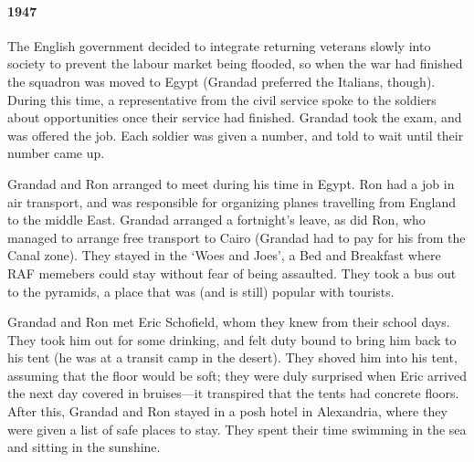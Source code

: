 \paragraph{1947} The English government
decided to integrate returning veterans slowly into society to prevent the labour market being
flooded, so when the war had finished the squadron was moved to Egypt (Grandad preferred the Italians, though).
During this time, a
representative from the civil service spoke to the soldiers about opportunities once their
service had finished. Grandad took the exam, and was offered the job. Each soldier was given
a number, and told to wait until their number came up.
\begin{figure}
	\centering
\end{figure}

Grandad and Ron arranged to meet during his time in Egypt. Ron had a job
in air transport, and was responsible for organizing planes travelling from England
to the middle East. Grandad arranged a fortnight's leave, as did Ron, who
managed to arrange free transport to Cairo (Grandad had to pay for his from
the Canal zone). They stayed in the `Woes and Joes', a Bed and Breakfast where RAF memebers
could stay without fear of being assaulted. They took a bus out to the pyramids, a place
that was (and is still) popular with tourists.

Grandad and Ron met Eric Schofield, whom they knew from their school days. They
took him out for some drinking, and felt duty bound to bring him back to his tent (he was
at a transit camp in the desert). They shoved him into his tent, assuming that
the floor would be soft; they were duly surprised when Eric arrived the next day
covered in bruises---it transpired that the tents had concrete floors. After this,
Grandad and Ron stayed in a posh hotel in Alexandria, where they were given
a list of safe places to stay. They spent their time swimming in the sea
and sitting in the sunshine.

